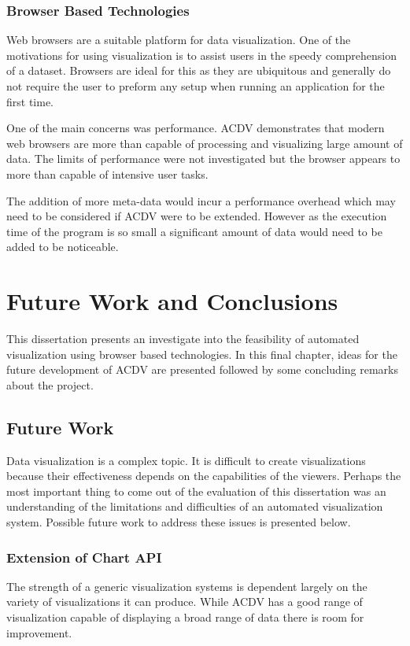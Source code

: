 \documentclass[a4paper, 11pt, titlepage, onehalfspacing]{report}
\begin{document}
\subsection{Browser Based Technologies}
Web browsers are a suitable platform for data visualization. One of the motivations for using visualization is to assist users in the speedy comprehension of a dataset. Browsers are ideal for this as they are ubiquitous and generally do not require the user to preform any setup when running an application for the first time.

One of the main concerns was performance. AC\lightning{}DV demonstrates that modern web browsers are more than capable of processing and visualizing large amount of data. The limits of performance were not investigated but the browser appears to more than capable of intensive user tasks.

The addition of more meta-data would incur a performance overhead which may need to be considered if AC\lightning{}DV were to be extended. However as the execution time of the program is so small a significant amount of data would need to be added to be noticeable.




\chapter{Future Work and Conclusions}
\label{future}
This dissertation presents an investigate into the feasibility of automated visualization using browser based technologies. In this final chapter, ideas for the future development of AC\lightning{}DV are presented followed by some concluding remarks about the project.

\section{Future Work}
Data visualization is a complex topic. It is difficult to create visualizations because their effectiveness depends on the capabilities of the viewers. Perhaps the most important thing to come out of the evaluation of this dissertation was an understanding of the limitations and difficulties of an automated visualization system. Possible future work to address these issues is presented below.

\subsection{Extension of Chart API}
The strength of a generic visualization systems is dependent largely on the variety of visualizations it can produce. While AC\lightning{}DV has a good range of visualization capable of displaying a broad range of data there is room for improvement. 
\end{document}
